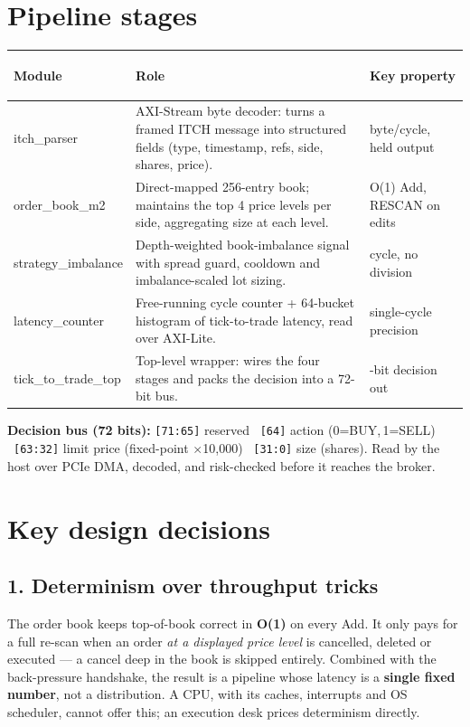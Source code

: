 \documentclass[10pt,a4paper]{article}
\begin{document}
\section{Pipeline stages}

\begin{center}
\renewcommand{\arraystretch}{1.25}
\begin{tabular}{@{}>{\bfseries\raggedright\arraybackslash}p{3.45cm} p{7.7cm} >{\raggedleft\arraybackslash}p{2.6cm}@{}}
\toprule
\normalfont\bfseries Module & \normalfont\bfseries Role & \normalfont\bfseries Key property \\
\midrule
itch\_parser        & AXI-Stream byte decoder: turns a framed ITCH message into structured fields (type, timestamp, refs, side, shares, price). & 1 byte/cycle, held output \\
order\_book\_m2     & Direct-mapped 256-entry book; maintains the top 4 price levels per side, aggregating size at each level. & O(1) Add, RESCAN on edits \\
strategy\_imbalance & Depth-weighted book-imbalance signal with spread guard, cooldown and imbalance-scaled lot sizing. & 1 cycle, no division \\
latency\_counter    & Free-running cycle counter + 64-bucket histogram of tick-to-trade latency, read over AXI-Lite. & single-cycle precision \\
tick\_to\_trade\_top & Top-level wrapper: wires the four stages and packs the decision into a 72-bit bus. & 72-bit decision out \\
\bottomrule
\end{tabular}
\end{center}

\textbf{Decision bus (72 bits):} \texttt{[71:65]} reserved \textbullet\ \texttt{[64]} action
(0=BUY,\,1=SELL) \textbullet\ \texttt{[63:32]} limit price (fixed-point $\times$10{,}000)
\textbullet\ \texttt{[31:0]} size (shares). Read by the host over PCIe DMA, decoded, and
risk-checked before it reaches the broker.

\section{Key design decisions}

\subsection{1. Determinism over throughput tricks}
The order book keeps top-of-book correct in \textbf{O(1)} on every Add. It only pays for a
full re-scan when an order \emph{at a displayed price level} is cancelled, deleted or
executed --- a cancel deep in the book is skipped entirely. Combined with the back-pressure
handshake, the result is a pipeline whose latency is a \textbf{single fixed number}, not a
distribution. A CPU, with its caches, interrupts and OS scheduler, cannot offer this; an
execution desk prices determinism directly.
\end{document}

